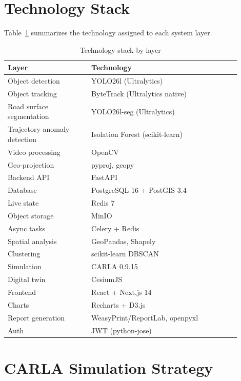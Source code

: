 \documentclass[conference]{IEEEtran}
\begin{document}
\section{Technology Stack}
\label{sec:stack}

Table~\ref{tab:stack} summarizes the technology assigned to each system layer.

\begin{table}[htbp]
\caption{Technology stack by layer}
\label{tab:stack}
\centering
\footnotesize
\begin{tabular}{@{}p{0.32\linewidth}p{0.58\linewidth}@{}}
\toprule
\textbf{Layer} & \textbf{Technology} \\
\midrule
Object detection & YOLO26l (Ultralytics) \\
Object tracking & ByteTrack (Ultralytics native) \\
Road surface segmentation & YOLO26l-seg (Ultralytics) \\
Trajectory anomaly detection & Isolation Forest (scikit-learn) \\
Video processing & OpenCV \\
Geo-projection & pyproj, geopy \\
Backend API & FastAPI \\
Database & PostgreSQL 16 + PostGIS 3.4 \\
Live state & Redis 7 \\
Object storage & MinIO \\
Async tasks & Celery + Redis \\
Spatial analysis & GeoPandas, Shapely \\
Clustering & scikit-learn DBSCAN \\
Simulation & CARLA 0.9.15 \\
Digital twin & CesiumJS \\
Frontend & React + Next.js 14 \\
Charts & Recharts + D3.js \\
Report generation & WeasyPrint/ReportLab, openpyxl \\
Auth & JWT (python-jose) \\
\bottomrule
\end{tabular}
\end{table}

\section{CARLA Simulation Strategy}
\label{sec:sim}
\end{document}
